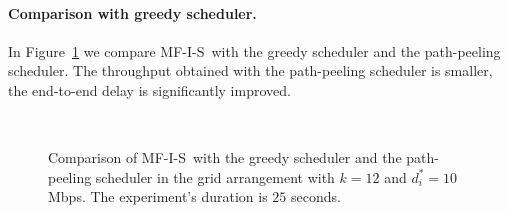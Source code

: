 \documentclass[12pt]{article}
\newenvironment{proof sketch}[1]{\noindent {\emph{Proof sketch of #1:}}}{\hfill \qed}
\newcommand{\algA}{\textsc{MF-I-S}}
\begin{document}
\paragraph{Comparison with greedy scheduler.}
In Figure~\ref{fig:big3} we compare \algA\ with the greedy scheduler
and the path-peeling scheduler.  The throughput obtained with the
path-peeling scheduler is smaller, the end-to-end delay is
significantly improved.

\begin{figure}%
  \centering
  \\
\caption{Comparison of \algA\ with the greedy scheduler and the path-peeling scheduler in  the grid arrangement with $k=12$ and $d^*_i=10$Mbps. The experiment's duration is $25$ seconds.}
  \label{fig:big3}
     \end{figure}


\end{document}
